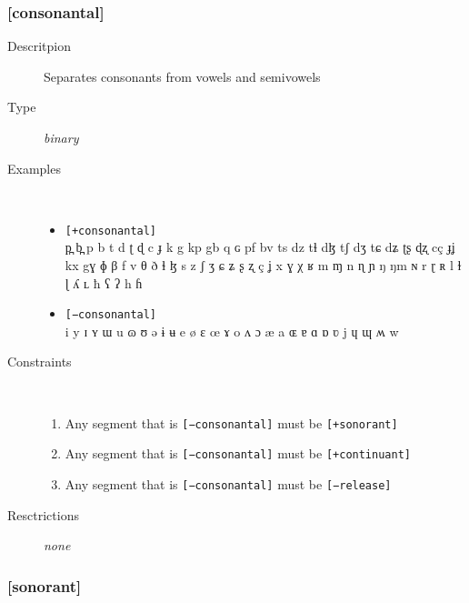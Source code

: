 \documentclass[10pt,letterpaper]{article}
\begin{document}
\subsubsection{[consonantal]}
\label{ssub:feature_consonantal}

\begin{description}
\item[Descritpion] Separates consonants from vowels and semivowels
\item[Type] \emph{binary}
\item[Examples]\
  \begin{itemize}
    \item \texttt{[+consonantal]}\\
    p̪ b̪ p b t d ʈ ɖ c ɟ k g kp gb q ɢ pf bv ts dz tɬ dɮ tʃ dʒ tɕ dʑ ʈʂ ɖʐ cç ɟʝ kx gɣ ɸ β f v θ ð ɬ ɮ s z ʃ ʒ ɕ ʑ ʂ ʐ ç ʝ x ɣ χ ʁ m ɱ n ɳ ɲ ŋ ŋm ɴ r ɽ ʀ l ɫ ɭ ʎ ʟ ħ ʕ ʔ h ɦ 
    \item \texttt{[−consonantal]}\\
    i y ɪ ʏ ɯ u ɷ ʊ ə ɨ ʉ e ø ɛ œ ɤ o ʌ ɔ æ a ɶ ɐ ɑ ɒ ʋ j ɥ ɰ ʍ w 
  \end{itemize}
\item[Constraints]\
  \begin{enumerate}
    \item Any segment that is \texttt{[−consonantal]} must be \texttt{[+sonorant]}

    \item Any segment that is \texttt{[−consonantal]} must be \texttt{[+continuant]}

    \item Any segment that is \texttt{[−consonantal]} must be \texttt{[−release]}
  \end{enumerate}
\item[Resctrictions] \emph{none}
\end{description}

\subsubsection{[sonorant]}
\label{ssub:feature_sonorant}
\end{document}
